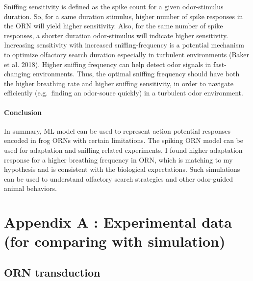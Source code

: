 \documentclass[
]{article}
\begin{document}
Sniffing sensitivity is defined as the spike count for a given odor-stimulus duration. So, for a same duration stimulus, higher number of spike responses in the ORN will yield higher sensitivity. Also, for the same number of spike responses, a shorter duration odor-stimulus will indicate higher sensitivity. Increasing sensitivity with increased sniffing-frequency is a potential mechanism to optimize olfactory search duration especially in turbulent environments (Baker et al. 2018). Higher sniffing frequency can help detect odor signals in fast-changing environments. Thus, the optimal sniffing frequency should have both the higher breathing rate and higher sniffing sensitivity, in order to navigate efficiently (e.g.~finding an odor-souce quickly) in a turbulent odor environment.

\hypertarget{conclusion}{%
\paragraph*{Conclusion}\label{conclusion}}

In summary, ML model can be used to represent action potential responses encoded in frog ORNs with certain limitations. The spiking ORN model can be used for adaptation and sniffing related experiments. I found higher adaptation response for a higher breathing frequency in ORN, which is matching to my hypothesis and is consistent with the biological expectations. Such simulations can be used to understand olfactory search strategies and other odor-guided animal behaviors.

\clearpage

\hypertarget{appendix-appendix}{%
\appendix}


\hypertarget{appendix-a-experimental-data-for-comparing-with-simulation}{%
\section*{Appendix A : Experimental data (for comparing with simulation)}\label{appendix-a-experimental-data-for-comparing-with-simulation}}

\hypertarget{orn-transduction}{%
\subsection*{ORN transduction}\label{orn-transduction}}
\end{document}

